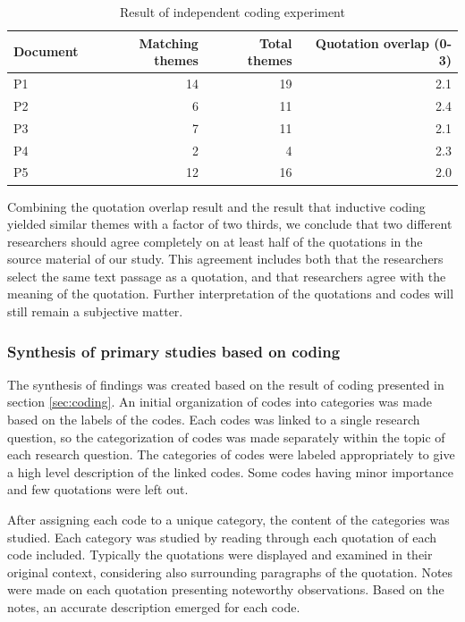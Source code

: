\begin{table}
    \centering
    \begin{tabular}{ l r r r }
        \toprule
        Document    &  Matching themes  &  Total themes  &  Quotation overlap (0-3) \\
        \midrule
        P1          &  14  &  19   &  2.1  \\
        P2          &   6  &  11   &  2.4  \\
        P3          &   7  &  11   &  2.1  \\
        P4          &   2  &   4   &  2.3  \\
        P5          &  12  &  16   &  2.0  \\
        \bottomrule
    \end{tabular}
    \caption{Result of independent coding experiment}
    \label{table:codingexperiment}
\end{table}

Combining the quotation overlap result and the result that inductive coding
yielded similar themes with a factor of two thirds, we conclude that two
different researchers should agree completely on at least half of the quotations
in the source material of our study. This agreement includes both that the
researchers select the same text passage as a quotation, and that researchers
agree with the meaning of the quotation. Further interpretation of the
quotations and codes will still remain a subjective matter.


\subsubsection{Synthesis of primary studies based on coding}

The synthesis of findings was created based on the result of coding presented in
section \ref{sec:coding}. An initial organization of codes into categories was
made based on the labels of the codes. Each codes was linked to a single
research question, so the categorization of codes was made separately within
the topic of each research question. The categories of codes were labeled
appropriately to give a high level description of the linked codes. Some codes
having minor importance and few quotations were left out.

After assigning each code to a unique category, the content of the categories
was studied. Each category was studied by reading through each quotation of each
code included. Typically the quotations were displayed and examined in their
original context, considering also surrounding paragraphs of the quotation.
Notes were made on each quotation presenting noteworthy observations. Based on
the notes, an accurate description emerged for each code.


